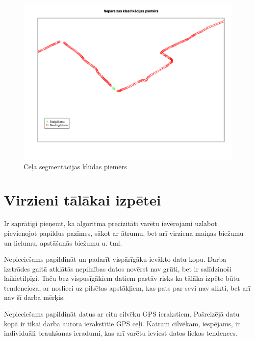 \documentclass{ludis}
\begin{document}
\begin{figure}
  \centering
  \includegraphics[scale=0.45]{img/wrong_segmentation}
  \caption{Ceļa segmentācijas kļūdas piemērs}
  \label{fig:wrong_segmentation}
\end{figure}

\section{Virzieni tālākai izpētei}
Ir saprātīgi pieņemt, ka algoritma precizitāti varētu ievērojami uzlabot pievienojot papildus
pazīmes, sākot ar ātrumu, bet arī virziena maiņas biežumu un lielumu, apstāšanās biežumu u. tml.

Nepieciešams papildināt un padarīt vispārīgāku ievākto datu kopu. Darba izstrādes gaitā atklātās
nepilnības datos novērst nav grūti, bet ir salīdzinoši laikietilpīgi. Taču bez vispu\-sīgākiem
datiem pastāv risks ka tālāka izpēte būtu tendencioza, ar noslieci uz 
pilsētas \linebreak apstākļiem, kas pats par sevi nav slikti, bet arī nav šī darba mērķis.

Nepieciešams papildināt datus ar citu cilvēku GPS ierakstiem. Pašreizējā datu kopā ir tikai darba
autora ierakstītie GPS ceļi. Katram cilvēkam, iespējams, ir individuāli braukšanas 
\linebreak ieradumi, kas arī varētu ieviest datos liekas tendences.
\end{document}
